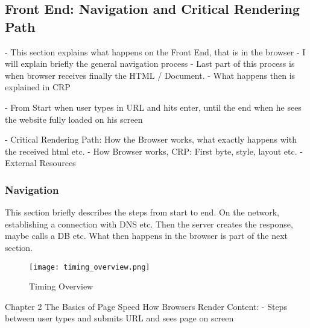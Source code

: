 \subsection{Front End: Navigation and Critical Rendering Path}

- This section explains what happens on the Front End, that is in the browser
- I will explain briefly the general navigation process
- Last part of this process is when browser receives finally the HTML / Document. 
- What happens then is explained in CRP

- From Start when user types in URL and hits enter, until the end when he sees the website fully loaded on his screen


- Critical Rendering Path: How the Browser works, what exactly happens with the received html etc.
- How Browser works, CRP: First byte, style, layout etc.
- External Resources





\subsubsection{Navigation}



This section briefly describes the steps from start to end.
On the network, establishing a connection with DNS etc.
Then the server creates the response, maybe calls a DB etc.
What then happens in the browser is part of the next section.


\begin{figure}[h!]
\begin{center}
\texttt{[image: timing\_overview.png]}
\caption{Timing Overview}
\label{img:timing_overview}
\end{center}
\end{figure}



Chapter 2 The Basics of Page Speed
How Browsers Render Content:
- Steps between user types and submits URL and sees page on screen




